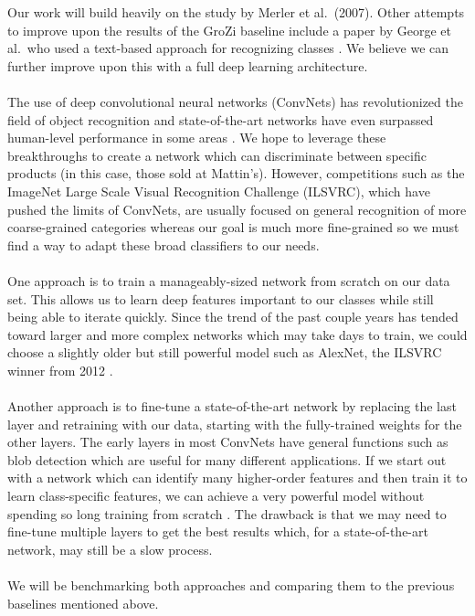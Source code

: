 \documentclass{article}
\begin{document}
Our work will build heavily on the study by Merler et al.\ (2007). Other attempts to improve upon the results of the GroZi baseline include a paper by George et al.\ who used a text-based approach for recognizing classes \cite{george15}. We believe we can further improve upon this with a full deep learning architecture.
\\ \\
The use of deep convolutional neural networks (ConvNets) has revolutionized the field of object recognition and state-of-the-art networks have even surpassed human-level performance in some areas \cite{he15,russakovsky14}. We hope to leverage these breakthroughs to create a network which can discriminate between specific products (in this case, those sold at Mattin's). However, competitions such as the ImageNet Large Scale Visual Recognition Challenge (ILSVRC), which have pushed the limits of ConvNets, are usually focused on general recognition of more coarse-grained categories whereas our goal is much more fine-grained so we must find a way to adapt these broad classifiers to our needs.
\\ \\
One approach is to train a manageably-sized network from scratch on our data set. This allows us to learn deep features important to our classes while still being able to iterate quickly. Since the trend of the past couple years has tended toward larger and more complex networks which may take days to train, we could choose a slightly older but still powerful model such as AlexNet, the ILSVRC winner from 2012 \cite{krizhevsky12}.
\\ \\
Another approach is to fine-tune a state-of-the-art network by replacing the last layer and retraining with our data, starting with the fully-trained weights for the other layers. The early layers in most ConvNets have general functions such as blob detection which are useful for many different applications. If we start out with a network which can identify many higher-order features and then train it to learn class-specific features, we can achieve a very powerful model without spending so long training from scratch \cite{donahue13}. The drawback is that we may need to fine-tune multiple layers to get the best results which, for a state-of-the-art network, may still be a slow process.
\\ \\
We will be benchmarking both approaches and comparing them to the previous baselines mentioned above.




\end{document}
